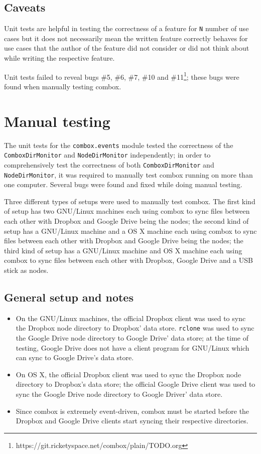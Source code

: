\subsection{Caveats}

Unit tests are helpful in testing the correctness of a feature for
\verb+N+ number of use cases but it does not necessarily mean the
written feature correctly behaves for use cases that the author of the
feature did not consider or did not think about while writing the
respective feature.

Unit tests failed to reveal bugs \#5, \#6, \#7, \#10 and
\#11\footnote{https://git.ricketyspace.net/combox/plain/TODO.org};
these bugs were found when manually testing combox.

\section{Manual testing}\label{sec:4-manual-testing}

The unit tests for the \verb+combox.events+ module tested the
correctness of the \verb+ComboxDirMonitor+ and \verb+NodeDirMonitor+
independently; in order to comprehensively test the correctness of
both \verb+ComboxDirMonitor+ and \verb+NodeDirMonitor+, it was
required to manually test combox running on more than one
computer. Several bugs were found and fixed while doing manual
testing.

Three different types of setups were used to manually test combox. The
first kind of setup has two GNU/Linux machines each using combox to
sync files between each other with Dropbox and Google Drive being the
nodes; the second kind of setup has a GNU/Linux machine and a OS X
machine each using combox to sync files between each other with
Dropbox and Google Drive being the nodes; the third kind of setup has
a GNU/Linux machine and OS X machine each using combox to sync files
between each other with Dropbox, Google Drive and a USB stick as
nodes.

\subsection{General setup and notes}

\begin{itemize}
\item On the GNU/Linux machines, the official Dropbox client was used
  to sync the Dropbox node directory to Dropbox' data
  store. \verb+rclone+\cite{program:rclone} was used to sync the
  Google Drive node directory to Google Drive' data store; at the time
  of testing, Google Drive does not have a client program for
  GNU/Linux which can sync to Google Drive's data store.
\item On OS X, the official Dropbox client was used to sync the
  Dropbox node directory to Dropbox's data store; the official Google
  Drive client was used to sync the Google Drive node directory to
  Google Driver' data store.
\item Since combox is extremely event-driven, combox must be started
  before the Dropbox and Google Drive clients start syncing their
  respective directories.
\end{itemize}

